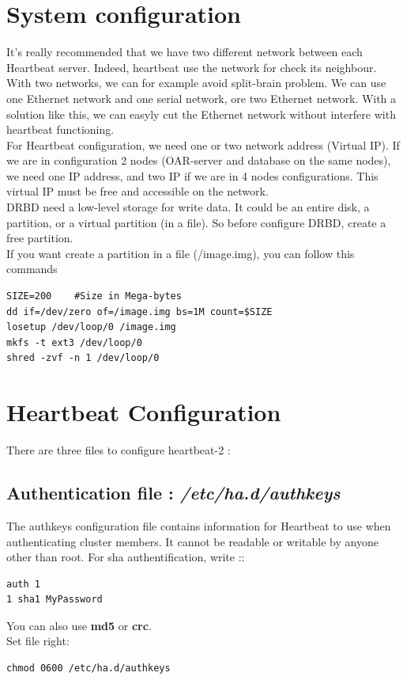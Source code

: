\documentclass[a4paper,10pt]{report}
\begin{document}
\section{System configuration}
It's really recommended that we have two different network between each Heartbeat server. Indeed, heartbeat use the network for check its neighbour. With two networks, we can for example avoid split-brain problem. We can use one Ethernet network and one serial network, ore two Ethernet network. With a solution like this, we can easyly cut the Ethernet network without interfere with heartbeat functioning.\\
For Heartbeat configuration, we need one or two network address (Virtual IP). If we are in configuration 2 nodes (OAR-server and database on the same nodes), we need one IP address, and two IP if we are in 4 nodes configurations. This virtual IP must be free and accessible on the network.\\
DRBD need a low-level storage for write data. It could be an entire disk, a partition, or a virtual partition (in a file). So before configure DRBD, create a free partition.\\
If you want create a partition in a file (/image.img), you can follow this commands
\begin{lstlisting}
SIZE=200	#Size in Mega-bytes
dd if=/dev/zero of=/image.img bs=1M count=$SIZE
losetup /dev/loop/0 /image.img
mkfs -t ext3 /dev/loop/0
shred -zvf -n 1 /dev/loop/0	
\end{lstlisting}



\section{Heartbeat Configuration}

There are three files to configure heartbeat-2 :
\subsection{Authentication file : \textit{/etc/ha.d/authkeys}}
The authkeys configuration file contains information for Heartbeat to use when authenticating cluster members. It cannot be readable or writable by anyone other than root. For sha authentification, write ::
\begin{lstlisting}
auth 1
1 sha1 MyPassword
\end{lstlisting}
You can also use \textbf{md5} or \textbf{crc}.\\
Set file right:
\begin{lstlisting}
chmod 0600 /etc/ha.d/authkeys
\end{lstlisting}
\end{document}
